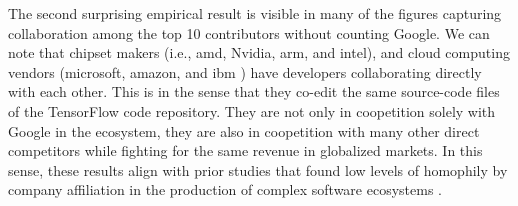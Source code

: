 \documentclass[CHICAGO,Times1COL]{WileyNJDv5} %
\begin{document}

The second surprising empirical result is visible in many of the figures capturing collaboration among the top 10 contributors without counting Google.
We can note that chipset makers (i.e., amd, Nvidia, arm, and intel), and cloud computing vendors (microsoft, amazon, and ibm ) have developers collaborating directly with
each other. This is in the sense that they co-edit the same source-code files of the TensorFlow code repository. They are not only in coopetition solely with Google in
the ecosystem, they are also in coopetition with many other direct competitors while fighting for the same revenue in globalized markets.  In this sense, these results
align with prior studies that found low levels of homophily by company affiliation in the production of complex software ecosystems
\citep[see][]{teixeira_et_al2020_homophily_linux_kernel,NguyenDucCruzes_et_al2019}. 









 
\end{document}
